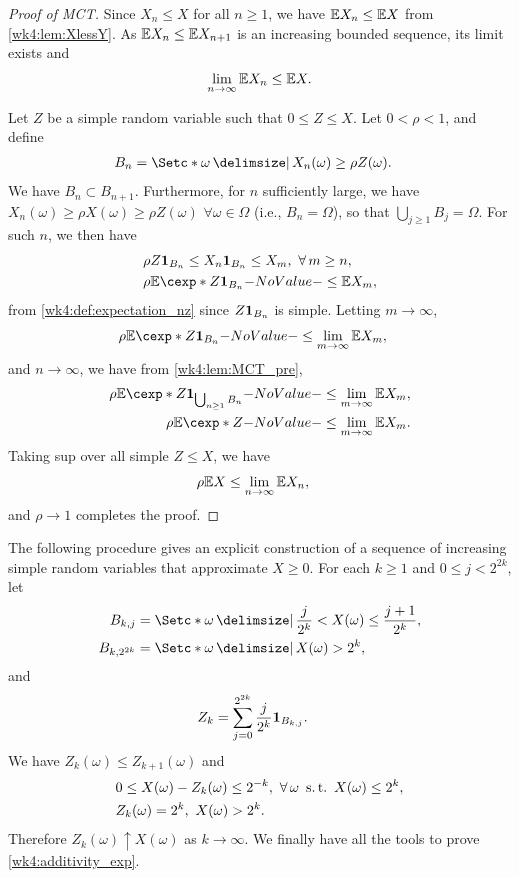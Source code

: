 \documentclass[12pt]{article}
\begin{document}
\begin{proof}[Proof of MCT]
Since $X_n\leq X$ for all $n\geq1$, we have $\E X_n \leq \E X$ from \cref{wk4:lem:XlessY}. As $\E X_n \leq \E X_{n+1}$ is an increasing bounded sequence, its limit exists and
\begin{align*}
\lim_{n\to\infty} \E X_n \leq \E X.
\end{align*}

Let $Z$ be a simple random variable such that $0\leq Z\leq X$. Let $0<\rho<1$, and define
\begin{align*}
B_n&=\set*{\omega \given X_n(\omega)\geq \rho Z(\omega)}.
\end{align*}
We have $B_n \subset B_{n+1}$. Furthermore, for $n$ sufficiently large, we have $X_{n}(\omega)\geq \rho X(\omega) \geq \rho Z(\omega)$ $\forall \omega\in\Omega$ (i.e., $B_n=\Omega$), so that $\bigcup_{j\geq1} B_j = \Omega$.  For such $n$, we then have
\begin{align*}
&\rho Z \indicatore{B_{n}} \leq X_n \indicatore{B_{n}} \leq X_m,\ \forall m\geq n,\\
& \rho \E[Z\indicatore{B_{n}}] \leq \E X_m,
\end{align*}
from \cref{wk4:def:expectation_nz} since $Z{\bf 1}_{B_{n}}$ is simple. Letting $m\to \infty$,
\begin{align*}
&\rho \E [Z \indicatore{B_{n}}] \leq \lim_{m \to \infty}\E X_m,
\end{align*}
and $n \to \infty$, we have from \cref{wk4:lem:MCT_pre},
\begin{align*}
\rho \E [Z\indicatore{\bigcup_{n\geq1} B_n}]&\leq \lim_{m \to \infty}\E X_m,\\
\rho \E [Z] &\leq \lim_{m \to \infty}\E X_m.
\end{align*}
Taking sup over all simple $Z \leq X$, we have
\begin{align*}
& \rho \E X \leq \lim_{n \to \infty}\E X_n,
\end{align*}
and $\rho \to 1$ completes the proof.
\end{proof}

The following procedure gives an explicit construction of a sequence of increasing simple random variables that approximate $X \geq 0$. For each $k\geq 1$ and $0 \leq j <2^{2k}$, let
\begin{align*}
B_{k,j} &=\set*{\omega \given \frac{j}{2^k}<X(\omega)\leq \frac{j+1}{2^k}},\\
B_{k,2^{2k}} &=\set*{\omega \given X(\omega)>2^k},
\end{align*}
and
\begin{align*}
Z_k &=\sum_{j=0}^{2^{2k}}{\frac{j}{2^k}{\bf 1}_{B_{k,j}}}.
\end{align*}
We have $Z_k(\omega) \leq Z_{k+1}(\omega)$ and 
\begin{align*}
& 0 \leq X(\omega)-Z_k(\omega)\leq 2^{-k},\ \forall \omega\ \st X(\omega)\leq 2^{k}, \\
& Z_k(\omega)=2^k, \ X(\omega) > 2^k.
\end{align*}
Therefore $Z_k(\omega)\uparrow X(\omega)$ as $k\to\infty$. We finally have all the tools to prove \cref{wk4:additivity_exp}.
\end{document}
